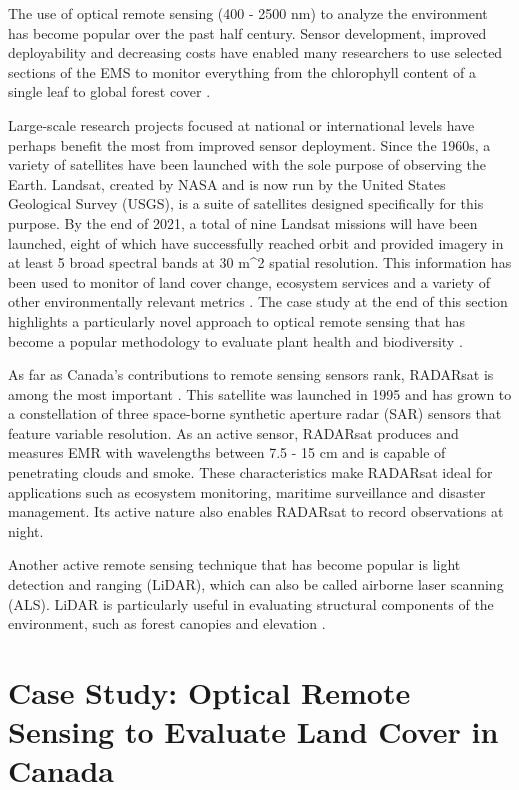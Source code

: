\documentclass[
]{book}
\begin{document}
The use of optical remote sensing (400 - 2500 nm) to analyze the environment has become popular over the past half century. Sensor development, improved deployability and decreasing costs have enabled many researchers to use selected sections of the EMS to monitor everything from the chlorophyll content of a single leaf \citep{curran_remote_1989} to global forest cover \citep{hansen_high-resolution_2013}.

Large-scale research projects focused at national or international levels have perhaps benefit the most from improved sensor deployment. Since the 1960s, a variety of satellites have been launched with the sole purpose of observing the Earth. Landsat, created by NASA and is now run by the United States Geological Survey (USGS), is a suite of satellites designed specifically for this purpose. By the end of 2021, a total of nine Landsat missions will have been launched, eight of which have successfully reached orbit and provided imagery in at least 5 broad spectral bands at 30 m\^{}2 spatial resolution. This information has been used to monitor of land cover change, ecosystem services and a variety of other environmentally relevant metrics \citep{deel_relationship_2012}. The case study at the end of this section highlights a particularly novel approach to optical remote sensing that has become a popular methodology to evaluate plant health and biodiversity \citep{ustin_imaging_2009, wang_spatial_2018}.

As far as Canada's contributions to remote sensing sensors rank, RADARsat is among the most important \citep{raney_radarsat_1991}. This satellite was launched in 1995 and has grown to a constellation of three space-borne synthetic aperture radar (SAR) sensors that feature variable resolution. As an active sensor, RADARsat produces and measures EMR with wavelengths between 7.5 - 15 cm and is capable of penetrating clouds and smoke. These characteristics make RADARsat ideal for applications such as ecosystem monitoring, maritime surveillance and disaster management. Its active nature also enables RADARsat to record observations at night.

Another active remote sensing technique that has become popular is light detection and ranging (LiDAR), which can also be called airborne laser scanning (ALS). LiDAR is particularly useful in evaluating structural components of the environment, such as forest canopies and elevation \citep{coops_estimating_2007}.

\section{Case Study: Optical Remote Sensing to Evaluate Land Cover in Canada}\label{case-study-optical-remote-sensing-to-evaluate-land-cover-in-canada}
\end{document}
